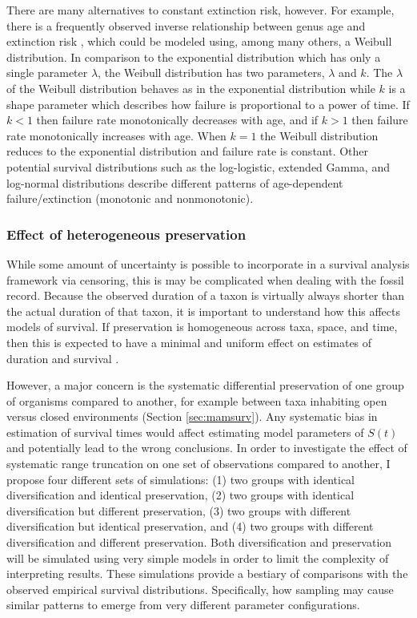 \documentclass[12pt,letterpaper]{article}
\begin{document}
There are many alternatives to constant extinction risk, however. For example, there is a frequently observed inverse relationship between genus age and extinction risk \citep{Finnegan2008}, which could be modeled using, among many others, a Weibull distribution. In comparison to the exponential distribution which has only a single parameter \(\lambda\), the Weibull distribution has two parameters, \(\lambda\) and \(k\). The \(\lambda\) of the Weibull distribution behaves as in the exponential distribution while \(k\) is a shape parameter which describes how failure is proportional to a power of time. If \(k < 1\) then failure rate monotonically decreases with age, and if \(k > 1\) then failure rate monotonically increases with age. When \(k = 1\) the Weibull distribution reduces to the exponential distribution and failure rate is constant. Other potential survival distributions such as the log-logistic, extended Gamma, and log-normal distributions \citep{Kleinbaum2005} describe different patterns of age-dependent failure/extinction (monotonic and nonmonotonic).

\subsubsection{Effect of heterogeneous preservation} \label{sec:survsim}
While some amount of uncertainty is possible to incorporate in a survival analysis framework via censoring, this is may be complicated when dealing with the fossil record. Because the observed duration of a taxon is virtually always shorter than the actual duration of that taxon, it is important to understand how this affects models of survival. If preservation is homogeneous across taxa, space, and time, then this is expected to have a minimal and uniform effect on estimates of duration and survival \citep{Sepkoski1975,Foote1996e,Foote1997c}.

However, a major concern is the systematic differential preservation of one group of organisms compared to another, for example between taxa inhabiting open versus closed environments (Section \ref{sec:mamsurv}). Any systematic bias in estimation of survival times would affect estimating model parameters of \(S(t)\) and potentially lead to the wrong conclusions. In order to investigate the effect of systematic range truncation on one set of observations compared to another, I propose four different sets of simulations: (1) two groups with identical diversification and identical preservation, (2) two groups with identical diversification but different preservation, (3) two groups with different diversification but identical preservation, and (4) two groups with different diversification and different preservation. Both diversification and preservation will be simulated using very simple models in order to limit the complexity of interpreting results. These simulations provide a bestiary of comparisons with the observed empirical survival distributions. Specifically, how sampling may cause similar patterns to emerge from very different parameter configurations. 
\end{document}
